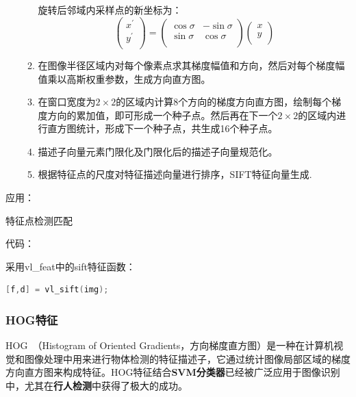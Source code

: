 \documentclass[12pt]{article}
\begin{document}
\begin{enumerate}
\begin{enumerate}
        旋转后邻域内采样点的新坐标为：
        \begin{displaymath}
            \left( \begin{array}{c}
            x^{'} \\
            y^{'} \\
            \end{array} \right)
            =\left( \begin{array}{cc}
            \cos\sigma & -\sin\sigma \\
            \sin\sigma & \cos\sigma \\
            \end{array} \right)
             \left( \begin{array}{c}
            x \\
            y \\
            \end{array} \right)
        \end{displaymath}
        \item 在图像半径区域内对每个像素点求其梯度幅值和方向，然后对每个梯度幅值乘以高斯权重参数，生成方向直方图。
        \item 在窗口宽度为$2 \times 2$的区域内计算8个方向的梯度方向直方图，绘制每个梯度方向的累加值，即可形成一个种子点。然后再在下一个$2 \times 2$的区域内进行直方图统计，形成下一个种子点，共生成16个种子点。
        \item 描述子向量元素门限化及门限化后的描述子向量规范化。
        \item 根据特征点的尺度对特征描述向量进行排序，SIFT特征向量生成.
\end{enumerate}
\end{enumerate}

{\color{blue}应用}：

特征点检测匹配

{\color{blue}代码}：

采用vl\_feat中的sift特征函数：
    \begin{lstlisting}[language=C++]
    [f,d] = vl_sift(img);
    \end{lstlisting}

\subsubsection{HOG特征}

HOG~\cite{dalal2005histograms}（Histogram of Oriented Gradients，方向梯度直方图）是一种在计算机视觉和图像处理中用来进行物体检测的特征描述子，它通过统计图像局部区域的梯度方向直方图来构成特征。HOG特征结合\textbf{SVM分类器}已经被广泛应用于图像识别中，尤其在\textbf{行人检测}中获得了极大的成功。
\end{document}
